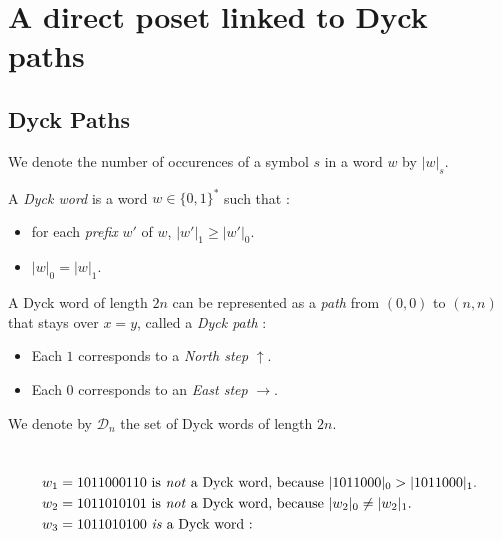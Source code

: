 \section{A direct poset linked to Dyck paths}

\subsection{Dyck Paths}

\begin{notation}
    We denote the number of occurences of a symbol $s$ in
    a word $w$ by $|w|_s$.
\end{notation}

\begin{definition}
    A \emph{Dyck word} is a word $w \in \{0,1\}^*$ such
    that :
    \begin{itemize}
        \item for each \emph{prefix} $w'$ of $w$,
            $|w'|_1 \geqslant |w'|_0$.
        \item $|w|_0 = |w|_1$.
    \end{itemize}
    A Dyck word of length $2n$ can be represented as a 
    \emph{path} from $(0,0)$ to $(n,n)$ that stays over
    $x = y$, called a \emph{Dyck path} :
    \begin{itemize}
        \item Each $1$ corresponds to a \emph{North step}
        $\uparrow$. 
        \item Each $0$ corresponds to an \emph{East step}
        $\rightarrow$.
    \end{itemize}
\end{definition}

We denote by $\mathcal{D}_n$ the set of Dyck words of
length $2n$.

\begin{example}[$n = 5$]
    ~\\
    \begin{align*}
        &w_1 = 1011000110 \text{ is \emph{not} a Dyck word,
        because } |1011000|_0 > |1011000|_1.\\
        &w_2 = 1011010101 \text{ is \emph{not} a Dyck word,
        because } |w_2|_0 \neq |w_2|_1.\\
        &w_3 = 1011010100 \text{ \emph{is} a Dyck word : }\\
    \end{align*}
    
\end{example}

